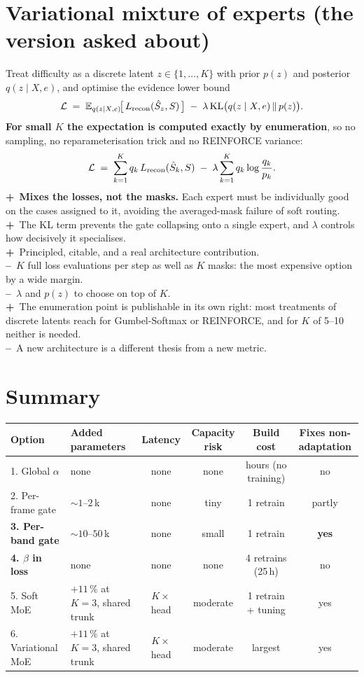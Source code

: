 \documentclass[11pt,a4paper]{article}
\newcommand{\pro}{\textbf{\textsf{+}}~}
\newcommand{\con}{\textbf{\textsf{--}}~}
\begin{document}
\section{Variational mixture of experts (the version asked about)}

Treat difficulty as a discrete latent $z \in \{1,\dots,K\}$ with prior $p(z)$
and posterior $q(z\mid X,e)$, and optimise the evidence lower bound
\[
\mathcal{L} \;=\;
  \mathbb{E}_{q(z\mid X,e)}\!\big[\,L_\textup{recon}(\hat{S}_z, S)\,\big]
  \;-\; \lambda\,\mathrm{KL}\big(q(z\mid X,e)\,\Vert\,p(z)\big).
\]
\textbf{For small $K$ the expectation is computed exactly by enumeration}, so no
sampling, no reparameterisation trick and no REINFORCE variance:
\[
\mathcal{L} \;=\; \sum_{k=1}^{K} q_k\,L_\textup{recon}(\hat{S}_k, S)
  \;-\; \lambda \sum_{k=1}^{K} q_k \log \frac{q_k}{p_k}.
\]
\pro \textbf{Mixes the losses, not the masks.} Each expert must be individually
good on the cases assigned to it, avoiding the averaged-mask failure of
soft routing.\\
\pro The KL term prevents the gate collapsing onto a single expert, and
$\lambda$ controls how decisively it specialises.\\
\pro Principled, citable, and a real architecture contribution.\\
\con $K$ full loss evaluations per step as well as $K$ masks: the most expensive
option by a wide margin.\\
\con $\lambda$ and $p(z)$ to choose on top of $K$.\\
\pro The enumeration point is publishable in its own right: most treatments of
discrete latents reach for Gumbel-Softmax or REINFORCE, and for $K$ of 5--10
neither is needed.\\
\con A new architecture is a different thesis from a new metric.

\section*{Summary}

\begin{tabularx}{\textwidth}{@{}lLcccc@{}}
\toprule
Option & Added parameters & Latency & Capacity risk & Build cost & Fixes non-adaptation \\
. Global $\alpha$        & none                & none & none   & hours (no training) & no \\
2. Per-frame gate         & ${\sim}1$--$2$\,k     & none & tiny   & 1 retrain           & partly \\
\textbf{3. Per-band gate} & ${\sim}10$--$50$\,k   & none & small  & 1 retrain           & \textbf{yes} \\
\textbf{4. $\beta$ in loss} & none              & none & none   & 4 retrains (25\,h)  & no \\
5. Soft MoE               & $+11\,\%$ at $K{=}3$, shared trunk & $K\times$ head & moderate & 1 retrain + tuning & yes \\
6. Variational MoE        & $+11\,\%$ at $K{=}3$, shared trunk & $K\times$ head & moderate & largest & yes \\
\bottomrule
\end{tabularx}
\end{document}

